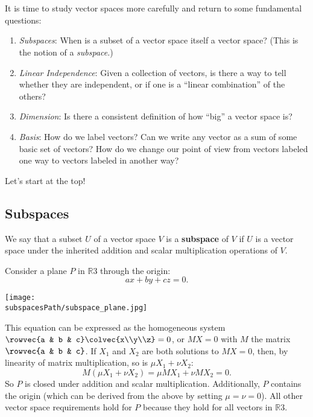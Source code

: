 \chapter{\subspacesTitle}\label{subspacesspanning}

It is time to study vector spaces more carefully and return to  some fundamental questions:

\begin{enumerate}
\item \emph{Subspaces}: When is a subset of a vector space itself a vector space?  (This is the notion of a \emph{subspace}.)

\item \emph{Linear Independence}: Given a collection of vectors, is there a way to tell whether they are independent, or if one is a ``linear combination'' of the others? 

\item \emph{Dimension}: Is there a consistent definition of how ``big'' a vector space is?

\item \emph{Basis}:  How do we label vectors?  Can we write any vector as a sum of some basic set of vectors?  How do we change our point of view from vectors labeled one way to vectors labeled in another way?
\end{enumerate}
Let's start at the top!

\section{Subspaces}

\begin{definition}
We say that a subset $U$ of a vector space $V$ is a {\bfseries subspace} of $V$ if $U$ is a vector space under the inherited addition and scalar multiplication operations of $V$. 
\end{definition}

\begin{example}
Consider a plane $P$ in $\mathbb{R}3$ through the origin:
\[
ax+by+cz=0.
\]

\begin{center}
\texttt{[image: \\subspacesPath/subspace\_plane.jpg]}
\end{center}
This equation can be expressed as the homogeneous system $\rowvec{a & b & c}\colvec{x\\y\\z}=0$, or $MX=0$ with $M$ the matrix $\rowvec{a & b & c}$.  If $X_1$ and $X_2$ are both solutions to $MX=0$, then, by linearity of matrix multiplication, so is $\mu X_1 + \nu X_2$:
\[
M(\mu X_1 + \nu X_2) = \mu MX_1 + \nu MX_2 = 0.
\]
So $P$ is closed under addition and scalar multiplication.  Additionally, $P$ contains the origin (which can be derived from the above by setting $\mu=\nu=0$).  All other vector space requirements hold for $P$ because they hold for all vectors in $\mathbb{R}3$.
\end{example}


